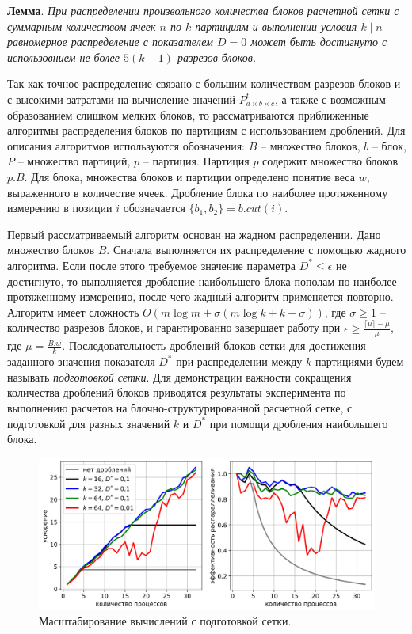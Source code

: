 \documentclass[a4paper,14pt]{extarticle}                     %
\theoremstyle{plain}                                         %
\begin{document}
\textbf{Лемма}. \textit{При распределении произвольного количества блоков расчетной сетки с суммарным количеством ячеек $n$ по $k$ партициям и выполнении условия $k \mid n$ равномерное распределение с показателем $D = 0$ может быть достигнуто с использовнием не более $5(k - 1)$ разрезов блоков.}

Так как точное распределение связано с большим количеством разрезов блоков и с высокими затратами на вычисление значений $P_{a \times b \times c}^t$, а также с возможным образованием слишком мелких блоков, то рассматриваются приближенные алгоритмы распределения блоков по партициям с использованием дроблений.
Для описания алгоритмов используются обозначения: $B$ -- множество блоков, $b$ -- блок, $P$ -- множество партиций, $p$ -- партиция.
Партиция $p$ содержит множество блоков $p.B$.
Для блока, множества блоков и партиции определено понятие веса $w$, выраженного в количестве ячеек.
Дробление блока по наиболее протяженному измерению в позиции $i$ обозначается $\{b_1, b_2\} = b.cut(i)$.

Первый рассматриваемый алгоритм основан на жадном распределении.
Дано множество блоков $B$.
Сначала выполняется их распределение с помощью жадного алгоритма.
Если после этого требуемое значение параметра $D^{*} \le \epsilon$ не достигнуто, то выполняется дробление наибольшего блока пополам по наиболее протяженному измерению, после чего жадный алгоритм применяется повторно.
Алгоритм имеет сложность $O(m \log m + \sigma(m \log k + k + \sigma))$, где $\sigma \ge 1$ -- количество разрезов блоков, и гарантированно завершает работу при $\epsilon \ge \frac{\lceil \mu \rceil - \mu}{\mu}$, где $\mu = \frac{B.w}{k}$. 
Последовательность дроблений блоков сетки для достижения заданного значения показателя $D^{*}$ при распределении между $k$ партициями будем называть \textit{подготовкой сетки}.
Для демонстрации важности сокращения количества дроблений блоков приводятся результаты эксперимента по выполнению расчетов на блочно-структурированной расчетной сетке, с подготовкой для разных значений $k$ и $D^{*}$ при помощи дробления наибольшего блока.

\begin{figure}[ht]
\centering
\includegraphics[width=1.0\textwidth]{./fig/par_scaling_with_prepare_big.png}
\singlespacing
\caption{Масштабирование вычислений с подготовкой сетки.}
\label{fig:par_scaling_with_prepare}
\end{figure}
\end{document}
